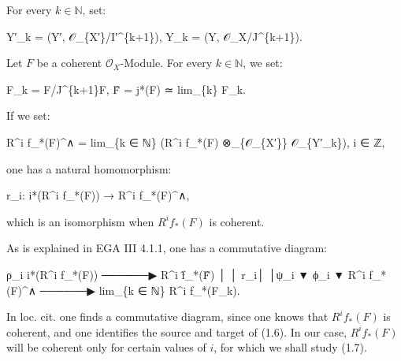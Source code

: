 \documentclass[
]{article}
\newenvironment{Shaded}{}{}
\newcommand{\NormalTok}[1]{#1}
\begin{document}
For every \(k \in \mathbb{N}\), set:

\begin{Shaded}
\begin{Highlighting}[]
\NormalTok{Y′\_k = (Y′, 𝒪\_\{X′\}/I′\^{}\{k+1\}),    Y\_k = (Y, 𝒪\_X/J\^{}\{k+1\}).}
\end{Highlighting}
\end{Shaded}

Let \(F\) be a coherent \(\mathcal{O}_{X}\)-Module. For every
\(k \in \mathbb{N}\), we set:

\begin{Shaded}
\begin{Highlighting}[]
\NormalTok{F\_k = F/J\^{}\{k+1\}F,    F̂ = j*(F) ≃ lim\_\{k\} F\_k.}
\end{Highlighting}
\end{Shaded}

If we set:

\begin{Shaded}
\begin{Highlighting}[]
\NormalTok{R\^{}i f\_*(F)\^{}∧ = lim\_\{k ∈ ℕ\} (R\^{}i f\_*(F) ⊗\_\{𝒪\_\{X′\}\} 𝒪\_\{Y′\_k\}),    i ∈ ℤ,}
\end{Highlighting}
\end{Shaded}

one has a natural homomorphism:

\begin{Shaded}
\begin{Highlighting}[]
\NormalTok{r\_i: i*(R\^{}i f\_*(F)) → R\^{}i f\_*(F)\^{}∧,}
\end{Highlighting}
\end{Shaded}

which is an isomorphism when \(R^{i} f_{*}(F)\) is coherent.

As is explained in EGA III 4.1.1, one has a commutative diagram:

\begin{Shaded}
\begin{Highlighting}[]
\NormalTok{                       ρ\_i}
\NormalTok{   i*(R\^{}i f\_*(F))  ──────▶  R\^{}i f̂\_*(F̂)}
\NormalTok{        │                       │}
\NormalTok{     r\_i│                       │ψ\_i}
\NormalTok{        ▼          ϕ\_i          ▼}
\NormalTok{   R\^{}i f\_*(F)\^{}∧  ──────▶  lim\_\{k ∈ ℕ\} R\^{}i f\_*(F\_k).}
\end{Highlighting}
\end{Shaded}

In loc. cit. one finds a commutative diagram, since one knows that
\(R^{i} f_{*}(F)\) is coherent, and one identifies the source and target
of (1.6). In our case, \(R^{i} f_{*}(F)\) will be coherent only for
certain values of \(i\), for which we shall study (1.7).
\end{document}
